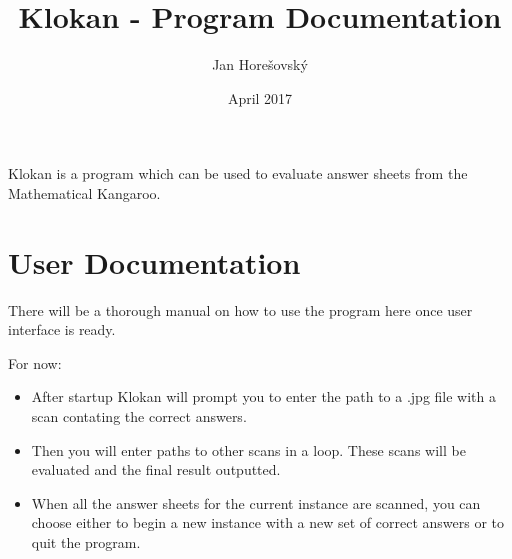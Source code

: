 \documentclass{article}
\begin{document}
\title{Klokan - Program Documentation}
\author{Jan Horešovský}
\date{April 2017}
\maketitle

Klokan is a program which can be used to evaluate answer sheets from the Mathematical Kangaroo.

\section{User Documentation}{
There will be a thorough manual on how to use the program here once user interface is ready.

For now:
\begin{itemize}
	\item After startup Klokan will prompt you to enter the path to a .jpg file with a scan contating the correct answers.
	\item Then you will enter paths to other scans in a loop. These scans will be evaluated and the final result outputted.
	\item When all the answer sheets for the current instance are scanned, you can choose either to begin a new instance with a new set of correct answers or to quit the program.
\end{itemize}
}
\end{document}
